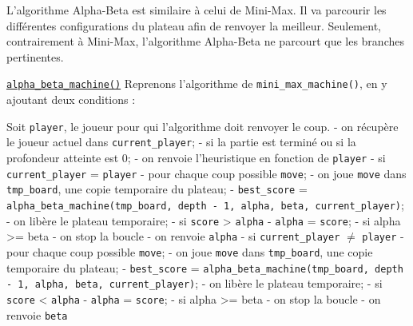 \documentclass{report}
\begin{document}
L'algorithme Alpha-Beta est similaire à celui de Mini-Max. Il va parcourir les différentes configurations du plateau afin de renvoyer la meilleur. Seulement, contrairement à Mini-Max, l'algorithme Alpha-Beta ne parcourt que les branches pertinentes.\newline

\underline{\texttt{alpha\_beta\_machine()}}
\newline
\newline
Reprenons l'algorithme de \texttt{mini\_max\_machine()}, en y ajoutant deux conditions :

Soit \texttt{player}, le joueur pour qui l'algorithme doit renvoyer le coup.\newline
- on récupère le joueur actuel dans \texttt{current\_player};\newline
- si la partie est terminé ou si la profondeur atteinte est 0;
\tabto{1 cm}- on renvoie l'heuristique en fonction de \texttt{player}\newline
- si \texttt{current\_player} = \texttt{player}
\tabto{1 cm}- pour chaque coup possible \texttt{move};
\tabto{1 cm} - on joue \texttt{move} dans \texttt{tmp\_board}, une copie temporaire du plateau;
\tabto{1 cm} - \texttt{best\_score} = \texttt{alpha\_beta\_machine(tmp\_board, depth - 1, alpha, beta, current\_player)};
\tabto{1 cm} - on libère le plateau temporaire;
\tabto{1 cm} - si \texttt{score} > \texttt{alpha}
\tabto{2 cm} - \texttt{alpha} = \texttt{score};
\tabto{2 cm} - si alpha >= beta
\tabto{3 cm} - on stop la boucle
\tabto{1 cm} - on renvoie \texttt{alpha}\newline
- si \texttt{current\_player} $\ne$ \texttt{player}
\tabto{1 cm}- pour chaque coup possible \texttt{move};
\tabto{1 cm} - on joue \texttt{move} dans \texttt{tmp\_board}, une copie temporaire du plateau;
\tabto{1 cm} - \texttt{best\_score} = \texttt{alpha\_beta\_machine(tmp\_board, depth - 1, alpha, beta, current\_player)};
\tabto{1 cm} - on libère le plateau temporaire;
\tabto{1 cm} - si \texttt{score} < \texttt{alpha}
\tabto{2 cm} - \texttt{alpha} = \texttt{score};
\tabto{2 cm} - si alpha >= beta
\tabto{3 cm} - on stop la boucle
\tabto{1 cm} - on renvoie \texttt{beta}
\newline
\newline
\end{document}

